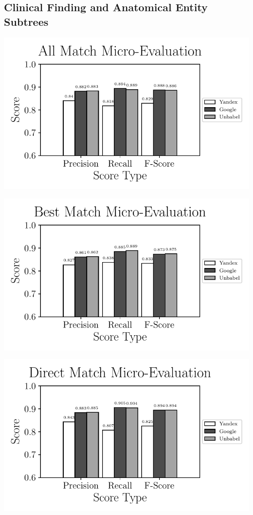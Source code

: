 \subsection{Clinical Finding and Anatomical Entity Subtrees}

\includegraphics{SupportFiles/plots/all_match_micro_clinical_anatomical_subtrees_plot.pdf}

\includegraphics{SupportFiles/plots/best_match_micro_clinical_anatomical_subtrees_plot.pdf}

\includegraphics{SupportFiles/plots/direct_match_micro_clinical_anatomical_subtrees_plot.pdf}

